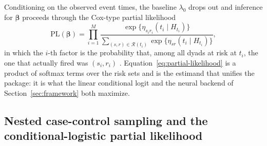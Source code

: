 Conditioning on the observed event times, the baseline $\lambda_0$ drops
out and inference for $\boldsymbol{\beta}$ proceeds through the Cox-type
partial likelihood
\begin{equation}
\mathrm{PL}(\boldsymbol{\beta})
  = \prod_{i=1}^{M}
    \frac{\exp\!\bigl\{\eta_{s_i r_i}(t_i \mid H_{t_i})\bigr\}}
         {\sum_{(s,r) \in \mathcal{R}(t_i)}
            \exp\!\bigl\{\eta_{sr}(t_i \mid H_{t_i})\bigr\}},
\label{eq:partial-likelihood}
\end{equation}
in which the $i$-th factor is the probability that, among all dyads at
risk at $t_i$, the one that actually fired was $(s_i, r_i)$
\citep{butts2008, bianchi2024}. Equation~\eqref{eq:partial-likelihood} is
a product of softmax terms over the risk sets and is the estimand that
unifies the package: it is what the linear conditional logit and the
neural backend of Section~\ref{sec:framework} both maximize.

\subsection{Nested case-control sampling and the conditional-logistic
partial likelihood}
\label{sec:case-control}

